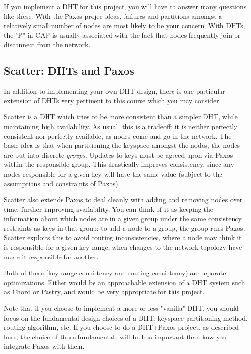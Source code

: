 \documentclass[12pt]{article}
\begin{document}
If you implement a DHT for this project, you will have to answer many questions like these. With the Paxos projec ideas, failures and partitions amongst a relatively small number of nodes are most likely to be your concern. With DHTs, the "P" in CAP is usually associated with the fact that nodes frequently join or disconnect from the network.

\subsection{Scatter: DHTs and Paxos}

In addition to implementing your own DHT design, there is one particular extension of DHTs very pertinent to this course which you may consider.

Scatter \cite{scatter} is a DHT which tries to be more consistent than a simpler DHT, while maintaining high availability. As usual, this is a tradeoff: it is neither perfectly consistent nor perfectly available, as nodes come and go in the network. The basic idea is that when partitioning the keyspace amongst the nodes, the nodes are put into discrete {\em groups}. Updates to keys must be agreed upon via Paxos within the responsible group. This drastically improves consistency, since any nodes responsible for a given key will have the same value (subject to the assumptions and constraints of Paxos).

Scatter also extends Paxos to deal cleanly with adding and removing nodes over time, further improving availability. You can think of it as keeping the information about which nodes are in a given group under the same consistency restraints as keys in that group: to add a node to a group, the group runs Paxos. Scatter exploits this to avoid routing inconsistencies, where a node may think it is responsible for a given key range, when changes to the network topology have made it responsible for another.

Both of these (key range consistency and routing consistency) are separate optimizations. Either would be an approachable extension of a DHT system such as Chord or Pastry, and would be very appropriate for this project.

Note that if you choose to implement a more-or-less "vanilla" DHT, you should focus on the fundamental design choices of a DHT: keyspace partitioning method, routing algorithm, etc. If you choose to do a DHT+Paxos project, as described here, the choice of those fundamentals will be less important than how you integrate Paxos with them.
\end{document}
